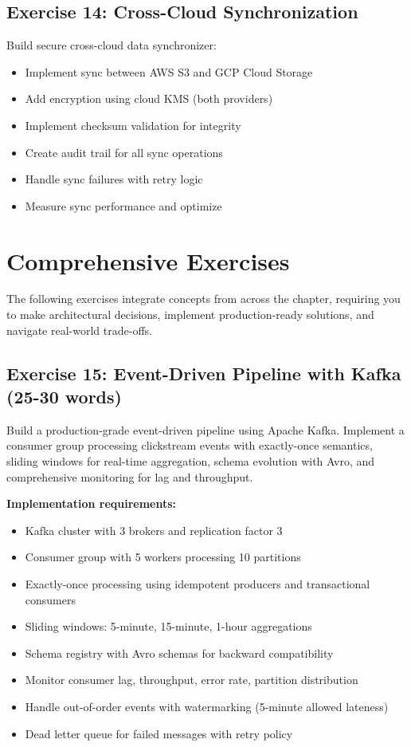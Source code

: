 \subsection{Exercise 14: Cross-Cloud Synchronization}

Build secure cross-cloud data synchronizer:
\begin{itemize}
    \item Implement sync between AWS S3 and GCP Cloud Storage
    \item Add encryption using cloud KMS (both providers)
    \item Implement checksum validation for integrity
    \item Create audit trail for all sync operations
    \item Handle sync failures with retry logic
    \item Measure sync performance and optimize
\end{itemize}

\section{Comprehensive Exercises}

The following exercises integrate concepts from across the chapter, requiring you to make architectural decisions, implement production-ready solutions, and navigate real-world trade-offs.

\subsection{Exercise 15: Event-Driven Pipeline with Kafka (25-30 words)}

Build a production-grade event-driven pipeline using Apache Kafka. Implement a consumer group processing clickstream events with exactly-once semantics, sliding windows for real-time aggregation, schema evolution with Avro, and comprehensive monitoring for lag and throughput.

\textbf{Implementation requirements:}
\begin{itemize}
    \item Kafka cluster with 3 brokers and replication factor 3
    \item Consumer group with 5 workers processing 10 partitions
    \item Exactly-once processing using idempotent producers and transactional consumers
    \item Sliding windows: 5-minute, 15-minute, 1-hour aggregations
    \item Schema registry with Avro schemas for backward compatibility
    \item Monitor consumer lag, throughput, error rate, partition distribution
    \item Handle out-of-order events with watermarking (5-minute allowed lateness)
    \item Dead letter queue for failed messages with retry policy
\end{itemize}


